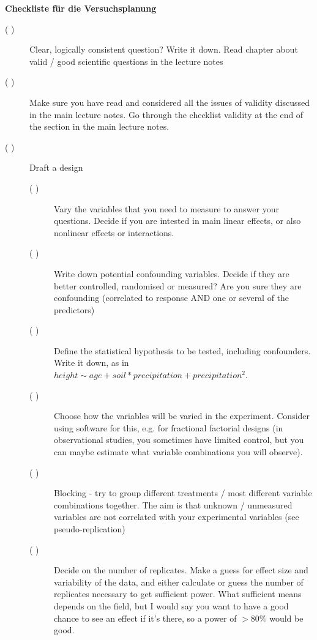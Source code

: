 \documentclass[a4paper,twoside]{tufte-book}\usepackage[]{graphicx}\usepackage[]{color}
\begin{document}
\newpage
\begin{mdframed}
    
\textbf{Checkliste für die Versuchsplanung}

\begin{description}

\item[( )] Clear, logically consistent question? Write it down. Read chapter about valid / good scientific questions in the lecture notes

\item[( )] Make sure you have read and considered all the issues of validity discussed in the main lecture notes. Go through the checklist validity at the end of the section in the main lecture notes.

\item[( )] Draft a design

  \begin{description}

  \item[( )] Vary the variables that you need to measure to answer your questions. Decide if you are intested in main linear effects, or also nonlinear effects or interactions. 
  
  \item[( )] Write down potential confounding variables. Decide if they are better controlled, randomised or measured? Are you sure they are confounding (correlated to response AND one or several of the predictors)
  
  \item[( )] Define the statistical hypothesis to be tested, including confounders. Write it down, as in $height  \sim age + soil * precipitation + precipitation^2$. 
  
  \item[( )] Choose how the variables will be varied in the experiment. Consider using software for this, e.g. for fractional factorial designs (in observational studies, you sometimes have limited control, but you can maybe estimate what variable combinations you will observe).
  
  \item[( )] Blocking - try to group different treatments / most different variable combinations together. The aim is that unknown / unmeasured variables are not correlated with your experimental variables (see pseudo-replication)
  
  \item[( )] Decide on the number of replicates. Make a guess for effect size and variability of the data, and either calculate or guess the number of replicates necessary to get sufficient power. What sufficient means depends on the field, but I would say you want to have a good chance to see an effect if it's there, so a power of $>80\%$ would be good. 
  

\end{description}
\end{description}
\end{mdframed}
\end{document}
